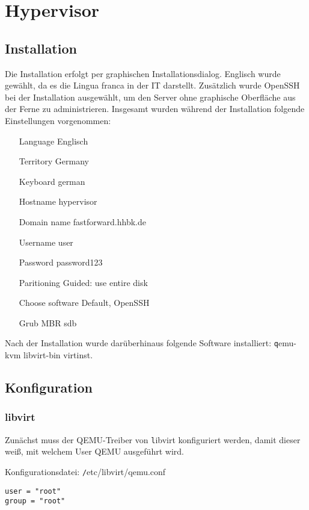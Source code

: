 \section{Hypervisor}

\subsection{Installation}

Die Installation erfolgt per graphischen Installationsdialog. Englisch wurde gewählt, da es die Lingua franca in der IT darstellt. Zusätzlich wurde OpenSSH bei der Installation ausgewählt, um den Server ohne graphische Oberfläche aus der Ferne zu administrieren. Insgesamt wurden während der Installation folgende Einstellungen vorgenommen:
\begin{itemize}[leftmargin=+1in]
	\item[Language] Englisch
	\item[Territory] Germany
	\item[Keyboard] german
	\item[Hostname] hypervisor
	\item[Domain name] fastforward.hhbk.de
	\item[Username] user
	\item[Password] password123
	\item[Paritioning] Guided: use entire disk
	\item[Choose software] Default, OpenSSH
	\item[Grub MBR] sdb
\end{itemize}

Nach der Installation wurde darüberhinaus folgende Software installiert: {\texttt qemu-kvm libvirt-bin virtinst}.

\subsection{Konfiguration}

\subsubsection{libvirt}

Zunächst muss der QEMU-Treiber von {\texttt libvirt} konfiguriert werden, damit dieser weiß, mit welchem User QEMU ausgeführt wird. 

Konfigurationsdatei: {\texttt /etc/libvirt/qemu.conf}
\begin{lstlisting}
user = "root"
group = "root"
\end{lstlisting}

